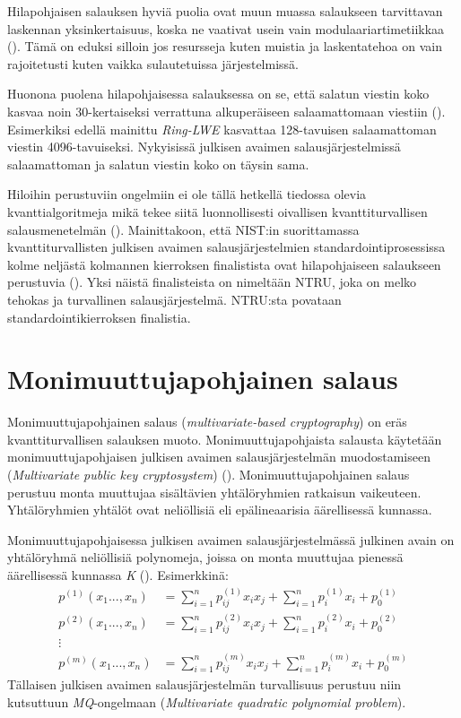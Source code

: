 Hilapohjaisen salauksen hyviä puolia ovat muun muassa salaukseen tarvittavan laskennan yksinkertaisuus, koska ne vaativat usein vain modulaariartimetiikkaa (\cite{regev2006lattice}). Tämä on eduksi silloin jos resursseja kuten muistia ja laskentatehoa on vain rajoitetusti kuten vaikka sulautetuissa järjestelmissä.

Huonona puolena hilapohjaisessa salauksessa on se, että salatun viestin koko kasvaa noin 30-kertaiseksi verrattuna alkuperäiseen salaamattomaan viestiin (\cite{8275352}). Esimerkiksi edellä mainittu \emph{Ring-LWE} kasvattaa 128-tavuisen salaamattoman viestin 4096-tavuiseksi. Nykyisissä julkisen avaimen salausjärjestelmissä salaamattoman ja salatun viestin koko on täysin sama.

Hiloihin perustuviin ongelmiin ei ole tällä hetkellä tiedossa olevia kvanttialgoritmeja mikä tekee siitä luonnollisesti oivallisen kvanttiturvallisen salausmenetelmän (\cite{regev2006lattice}). Mainittakoon, että NIST:in suorittamassa kvanttiturvallisten julkisen avaimen salausjärjestelmien standardointiprosessissa kolme neljästä kolmannen kierroksen finalistista ovat hilapohjaiseen salaukseen perustuvia (\cite{alagic2020status}). Yksi näistä finalisteista on nimeltään NTRU, joka on melko tehokas ja turvallinen salausjärjestelmä. NTRU:sta povataan standardointikierroksen finalistia.

\section{Monimuuttujapohjainen salaus}
Monimuuttujapohjainen salaus (\emph{multivariate-based cryptography}) on eräs kvanttiturvallisen salauksen muoto. Monimuuttujapohjaista salausta käytetään monimuuttujapohjaisen julkisen avaimen salausjärjestelmän muodostamiseen (\emph{Multivariate public key cryptosystem}) (\cite{Ding2009}). Monimuuttujapohjainen salaus perustuu monta muuttujaa sisältävien yhtälöryhmien ratkaisun vaikeuteen. Yhtälöryhmien yhtälöt ovat neliöllisiä eli epälineaarisia äärellisessä kunnassa.

Monimuuttujapohjaisessa julkisen avaimen salausjärjestelmässä julkinen avain on yhtälöryhmä neliöllisiä polynomeja, joissa on monta muuttujaa pienessä äärellisessä kunnassa \emph{K} (\cite{8012305}). Esimerkkinä: 
    \begin{align*}
        p^{(1)}(x_{1}...,x_{n}) &= \sum_{i=1}^{n} p_{ij}^{(1)}x_{i}x_ {j}+\sum_{i=1}^{n}p_ {i}^{(1)}x_{i}+p_ {0}^{(1)} \\
        p^{(2)}(x_{1}...,x_{n}) &= \sum_{i=1}^{n} p_{ij}^{(2)}x_{i}x_ {j}+\sum_{i=1}^{n}p_ {i}^{(2)}x_{i}+p_ {0}^{(2)} \\
        \vdots \\
        p^{(m)}(x_{1}...,x_{n}) &= \sum_{i=1}^{n} p_{ij}^{(m)}x_{i}x_ {j}+\sum_{i=1}^{n}p_ {i}^{(m)}x_{i}+p_ {0}^{(m)}
    \end{align*}
Tällaisen julkisen avaimen salausjärjestelmän turvallisuus perustuu niin kutsuttuun \emph{MQ}-ongelmaan (\emph{Multivariate quadratic polynomial problem}).

